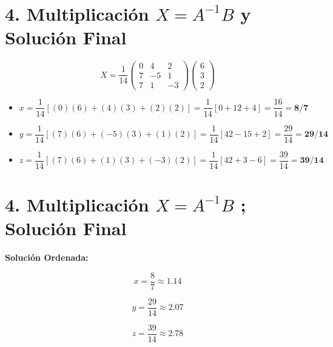 \documentclass{article}
\begin{document}
	\newpage
	
	
	\section*{4. Multiplicación $X = A^{-1}B$ y Solución Final}
	
	\[
	X = \dfrac{1}{14}
	\begin{pmatrix}
		0 &  4 &  2 \\
		7 & -5 &  1 \\
		7 &  1 & -3
	\end{pmatrix}
	\begin{pmatrix} 6 \\ 3 \\ 2 \end{pmatrix}
	\]
	
	\bigskip
	
	\begin{itemize}
		\item $x = \dfrac{1}{14}\left[(0)(6) + (4)(3) + (2)(2)\right]
		= \dfrac{1}{14}\left[0 + 12 + 4\right]
		= \dfrac{16}{14} = \mathbf{8/7}$
		
		\item $y = \dfrac{1}{14}\left[(7)(6) + (-5)(3) + (1)(2)\right]
		= \dfrac{1}{14}\left[42 - 15 + 2\right]
		= \dfrac{29}{14} = \mathbf{29/14}$
		
		\item $z = \dfrac{1}{14}\left[(7)(6) + (1)(3) + (-3)(2)\right]
		= \dfrac{1}{14}\left[42 + 3 - 6\right]
		= \dfrac{39}{14} = \mathbf{39/14}$
	\end{itemize}
		\newpage
	
	
	\section*{4. Multiplicación $X = A^{-1}B$ ; Solución Final}
	
	\noindent \textbf{Solución Ordenada:}

\bigskip

\[
x = \dfrac{8}{7} \approx 1.14
\]

\[
y = \dfrac{29}{14} \approx 2.07
\]

\[
z = \dfrac{39}{14} \approx 2.78
\]
	
	
\end{document}
